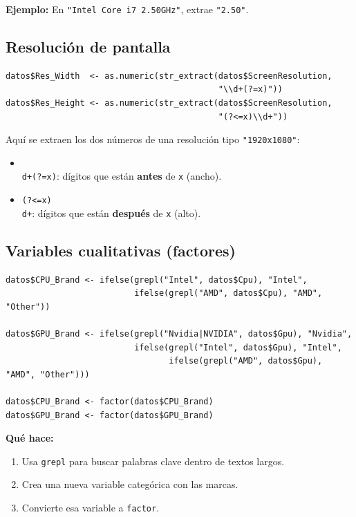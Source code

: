 \documentclass[12pt,a4paper]{article}
\begin{document}
\textbf{Ejemplo:} En \texttt{"Intel Core i7 2.50GHz"}, extrae \texttt{"2.50"}.

\subsection{Resolución de pantalla}

\begin{lstlisting}
datos$Res_Width  <- as.numeric(str_extract(datos$ScreenResolution, 
                                           "\\d+(?=x)"))
datos$Res_Height <- as.numeric(str_extract(datos$ScreenResolution, 
                                           "(?<=x)\\d+"))
\end{lstlisting}

Aquí se extraen los dos números de una resolución tipo \texttt{"1920x1080"}:
\begin{itemize}
    \item \texttt{\\d+(?=x)}: dígitos que están \textbf{antes} de \texttt{x} (ancho).
    \item \texttt{(?<=x)\\d+}: dígitos que están \textbf{después} de \texttt{x} (alto).
\end{itemize}

\subsection{Variables cualitativas (factores)}

\begin{lstlisting}[caption={Creando factores para CPU y GPU}]
datos$CPU_Brand <- ifelse(grepl("Intel", datos$Cpu), "Intel",
                          ifelse(grepl("AMD", datos$Cpu), "AMD", "Other"))
                           
datos$GPU_Brand <- ifelse(grepl("Nvidia|NVIDIA", datos$Gpu), "Nvidia",
                          ifelse(grepl("Intel", datos$Gpu), "Intel",
                                 ifelse(grepl("AMD", datos$Gpu), "AMD", "Other")))
                                 
datos$CPU_Brand <- factor(datos$CPU_Brand)
datos$GPU_Brand <- factor(datos$GPU_Brand)
\end{lstlisting}

\textbf{Qué hace:} 
\begin{enumerate}
    \item Usa \texttt{grepl} para buscar palabras clave dentro de textos largos.
    \item Crea una nueva variable categórica con las marcas.
    \item Convierte esa variable a \texttt{factor}.
\end{enumerate}
\end{document}
